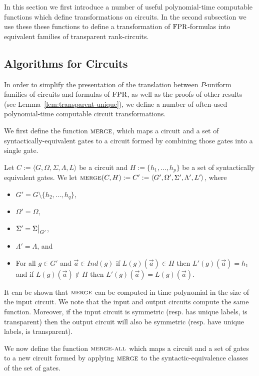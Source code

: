 \documentclass[../paper.tex]{subfiles}
\begin{document}
In this section we first introduce a number of useful polynomial-time computable
functions which define transformations on circuits. In the second subsection we
use these these functions to define a transformation of $\text{\upshape FPR}$-formulas into
equivalent families of transparent rank-circuits.

\subsection{Algorithms for Circuits}
In order to simplify the presentation of the translation between $P$-uniform
families of circuits and formulas of $\text{\upshape FPR}$, as well as the proofs of other
results (see Lemma~\ref{lem:transparent-unique}), we define a number of
often-used polynomial-time computable circuit transformations.

We first define the function ${\normalfont\textsc{merge}}$, which maps a circuit and a set of
syntactically-equivalent gates to a circuit formed by combining those gates into
a single gate.

\begin{definition}
  Let $C := \langle G, \Omega, \Sigma , \Lambda, L \rangle$ be a circuit and $H
  := \{h_1, \ldots, h_p\}$ be a set of syntactically equivalent gates. We let
  ${\normalfont\textsc{merge}}(C, H) := C' := \langle G', \Omega', \Sigma', \Lambda', L'
  \rangle$, where
  \begin{itemize}
    \setlength\itemsep{0mm}
  \item $G' = G \setminus \{h_2, \ldots, h_q\}$,
  \item $\Omega' = \Omega$,
  \item $\Sigma' = \restr{\Sigma}{G'}$,
  \item $\Lambda' = \Lambda$, and
  \item For all $g \in G'$ and $\vec{a} \in Ind(g)$ if $L(g) (\vec{a}) \in H$
    then $L'(g)(\vec{a}) = h_1$ and if $L(g)(\vec{a}) \notin H$ then
    $L'(g)(\vec{a}) = L(g)(\vec{a})$.
  \end{itemize}
\end{definition}

It can be shown that ${\normalfont\textsc{merge}}$ can be computed in time polynomial in the size
of the input circuit. We note that the input and output circuits compute the
same function. Moreover, if the input circuit is symmetric (resp. has unique
labels, is transparent) then the output circuit will also be symmetric (resp.
have unique labels, is transparent).

We now define the function ${\normalfont\textsc{merge-all}}$ which maps a circuit and a set of
gates to a new circuit formed by applying ${\normalfont\textsc{merge}}$ to the
syntactic-equivalence classes of the set of gates.
\end{document}
